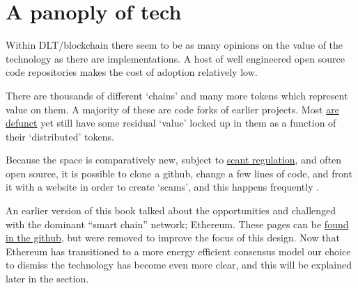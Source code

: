 \section{A panoply of tech}
Within DLT/blockchain there seem to be as many opinions on the value of the technology as there are implementations. A host of well engineered open source code repositories makes the cost of adoption relatively low. \par%
There are thousands of different `chains' and many more tokens which represent value on them. A majority of these are code forks of earlier projects. Most \href{https://99bitcoins.com/deadcoins/}{are defunct} yet still have some residual `value' locked up in them as a function of their `distributed' tokens. \par 
Because the space is comparatively new, subject to \href{https://www.esma.europa.eu/press-news/consultations/call-evidence-dlt-pilot-regime}{scant regulation}, and often open source, it is possible to clone a github, change a few lines of code, and front it with a website in order to create `scams', and this happens frequently \cite{golumbia2020cryptocurrency}.\par
An earlier version of this book talked about the opportunities and challenged with the dominant ``smart chain'' network; Ethereum. These pages can be \href{https://raw.githubusercontent.com/flossverse/product/draft/Book/03_ether.tex}{found in the github}, but were removed to improve the focus of this design. Now that Ethereum has transitioned to a more energy efficient consensus model our choice to dismiss the technology has become even more clear, and this will be explained later in the section.
%
